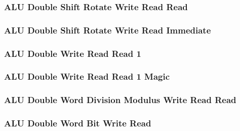 \subsubsection[{\small ALU Double Shift Rotate Write Read Read}]{ALU Double Shift Rotate Write Read Read} \label{sec:format-ALU-DSWRR}



\subsubsection[{\small ALU Double Shift Rotate Write Read Immediate}]{ALU Double Shift Rotate Write Read Immediate} \label{sec:format-ALU-DSWRI}



\subsubsection[{\small ALU Double Write Read Read 1}]{ALU Double Write Read Read 1} \label{sec:format-ALU-DWRR1}



\subsubsection[{\small ALU Double Write Read Read 1 Magic}]{ALU Double Write Read Read 1 Magic} \label{sec:format-ALU-DWRR1.M}



\subsubsection[{\small ALU Double Word Division Modulus Write Read Read}]{ALU Double Word Division Modulus Write Read Read} \label{sec:format-ALU-DDMWRR}



\subsubsection[{\small ALU Double Word Bit Write Read}]{ALU Double Word Bit Write Read} \label{sec:format-ALU-DBWR}

